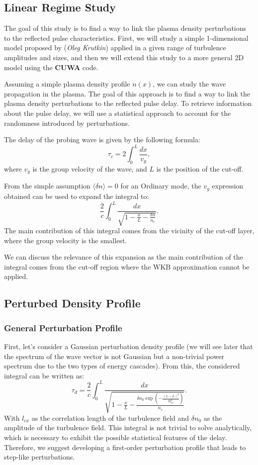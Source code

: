 \documentclass[11pt,a4paper,openany]{report}
\begin{document}
\begin{multicols}{2}

    \section{Linear Regime Study}
    The goal of this study is to find a way to link the plasma density perturbations to the reflected pulse characteristics. First, we will study a simple 1-dimensional model proposed by (\emph{Oleg Krutkin}) applied in a given range of turbulence amplitudes and sizes, and then we will extend this study to a more general 2D model using the \textbf{CUWA} code.

    Assuming a simple plasma density profile $n(x)$, we can study the wave propagation in the plasma. The goal of this approach is to find a way to link the plasma density perturbations to the reflected pulse delay. To retrieve information about the pulse delay, we will use a statistical approach to account for the randomness introduced by perturbations.

    The delay of the probing wave is given by the following formula:
    $$\tau_c = 2 \int_0^L \frac{dx}{v_g},$$
    where $v_g$ is the group velocity of the wave, and $L$ is the position of the cut-off.

    From the simple assumption $\langle \delta n \rangle = 0$ for an Ordinary mode, the $v_g$ expression obtained can be used to expand the integral to:
    $$\frac{2}{c} \int_0^L \frac{dx}{\sqrt{1 - \frac{x}{L} - \frac{\delta n }{n_c}}}.$$
    The main contribution of this integral comes from the vicinity of the cut-off layer, where the group velocity is the smallest.

    We can discuss the relevance of this expansion as the main contribution of the integral comes from the cut-off region where the WKB approximation cannot be applied.

    \subsection{Perturbed Density Profile}
    \subsubsection{General Perturbation Profile}
    First, let's consider a Gaussian perturbation density profile (we will see later that the spectrum of the wave vector is not Gaussian but a non-trivial power spectrum due to the two types of energy cascades). From this, the considered integral can be written as:
    $$\tau_d = \frac{2}{c} \int_0^L \frac{dx}{\sqrt{1 - \frac{x}{L} - \frac{\delta n_0 \exp\left(-\frac{(x - L)^2}{8l_{cx}^2}\right)}{n_c}}}.$$
    With $l_{cx}$ as the correlation length of the turbulence field and $\delta n_0$ as the amplitude of the turbulence field. This integral is not trivial to solve analytically, which is necessary to exhibit the possible statistical features of the delay. Therefore, we suggest developing a first-order perturbation profile that leads to step-like perturbations.


\end{multicols}
\end{document}
